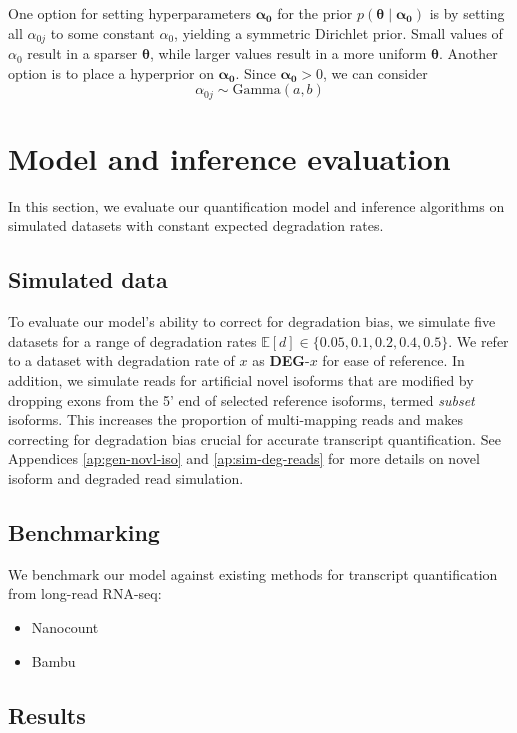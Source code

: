 One option for setting hyperparameters $\bm{\alpha_0}$ for the prior $p(\bm{\theta}\mid\bm{\alpha_0})$ is by setting all $\alpha_{0j}$ to some constant $\alpha_0$, yielding a symmetric Dirichlet prior. Small values of $\alpha_0$ result in a sparser $\bm\theta$, while larger values result in a more uniform $\bm\theta$. Another option is to place a hyperprior on $\bm{\alpha_0}$. Since $\bm{\alpha_0}>0$, we can consider
\begin{equation}
    \alpha_{0j}\sim\textrm{Gamma}(a,b)
\end{equation}


\section{Model and inference evaluation}

In this section, we evaluate our quantification model and inference algorithms on simulated datasets with constant expected degradation rates. 

\subsection{Simulated data}

To evaluate our model's ability to correct for degradation bias, we simulate five datasets for a range of degradation rates $\mathbb{E}[d]\in\{0.05,0.1,0.2,0.4,0.5\}$. We refer to a dataset with degradation rate of $x$ as \textbf{DEG}-$x$ for ease of reference. In addition, we simulate reads for artificial novel isoforms that are modified by dropping exons from the 5' end of selected reference isoforms, termed \textit{subset} isoforms. This increases the proportion of multi-mapping reads and makes correcting for degradation bias crucial for accurate transcript quantification. See Appendices \ref{ap:gen-novl-iso} and \ref{ap:sim-deg-reads} for more details on novel isoform and degraded read simulation. 

\subsection{Benchmarking}

We benchmark our model against existing methods for transcript quantification from long-read RNA-seq:
\begin{itemize}
    \item Nanocount
    \item Bambu
\end{itemize}

\subsection{Results}

